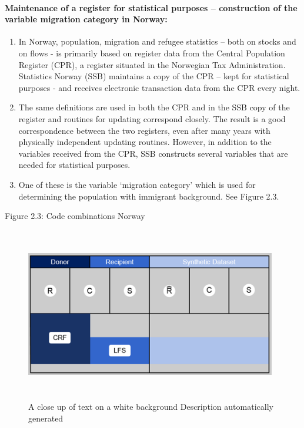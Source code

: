 \documentclass[
]{article}
\begin{document}
\hypertarget{maintenance-of-a-register-for-statistical-purposes-construction-of-the-variable-migration-category-in-norway}{%
\paragraph{\texorpdfstring{\textbf{Maintenance of a register for statistical purposes -- construction of the variable migration category in Norway:}}{Maintenance of a register for statistical purposes -- construction of the variable migration category in Norway:}}\label{maintenance-of-a-register-for-statistical-purposes-construction-of-the-variable-migration-category-in-norway}}

\begin{enumerate}
\def\labelenumi{\arabic{enumi}.}
\setcounter{enumi}{256}
\item
  In Norway, population, migration and refugee statistics -- both on
  stocks and on flows - is primarily based on register data from the
  Central Population Register (CPR), a register situated in the
  Norwegian Tax Administration. Statistics Norway (SSB) maintains a
  copy of the CPR -- kept for statistical purposes - and receives
  electronic transaction data from the CPR every night.
\item
  The same definitions are used in both the CPR and in the SSB copy
  of the register and routines for updating correspond closely. The
  result is a good correspondence between the two registers, even
  after many years with physically independent updating routines.
  However, in addition to the variables received from the CPR, SSB
  constructs several variables that are needed for statistical
  purposes.
\item
  One of these is the variable `migration category' which is used for
  determining the population with immigrant background. See Figure
  2.3.
\end{enumerate}

Figure 2.3: Code combinations Norway

\begin{figure}
\centering
\includegraphics[width=4.31181in,height=2.98681in]{media/image26.png}
\caption{A close up of text on a white background Description automatically
generated}
\end{figure}
\end{document}
